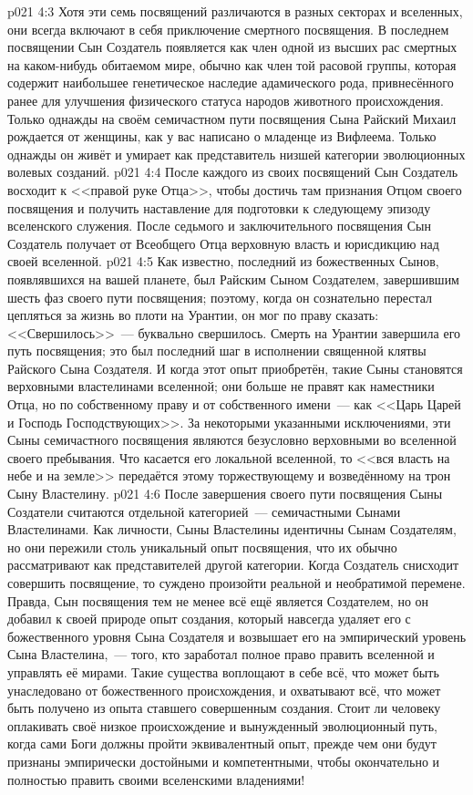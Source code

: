 \vs p021 4:3 Хотя эти семь посвящений различаются в разных секторах и вселенных, они всегда включают в себя приключение смертного посвящения. В последнем посвящении Сын Создатель появляется как член одной из высших рас смертных на каком\hyp{}нибудь обитаемом мире, обычно как член той расовой группы, которая содержит наибольшее генетическое наследие адамического рода, привнесённого ранее для улучшения физического статуса народов животного происхождения. Только однажды на своём семичастном пути посвящения Сына Райский Михаил рождается от женщины, как у вас написано о младенце из Вифлеема. Только однажды он живёт и умирает как представитель низшей категории эволюционных волевых созданий.
\vs p021 4:4 После каждого из своих посвящений Сын Создатель восходит к <<правой руке Отца>>, чтобы достичь там признания Отцом своего посвящения и получить наставление для подготовки к следующему эпизоду вселенского служения. После седьмого и заключительного посвящения Сын Создатель получает от Всеобщего Отца верховную власть и юрисдикцию над своей вселенной.
\vs p021 4:5 \pc Как известно, последний из божественных Сынов, появлявшихся на вашей планете, был Райским Сыном Создателем, завершившим шесть фаз своего пути посвящения; поэтому, когда он сознательно перестал цепляться за жизнь во плоти на Урантии, он мог по праву сказать: <<Свершилось>>~--- буквально свершилось. Смерть на Урантии завершила его путь посвящения; это был последний шаг в исполнении священной клятвы Райского Сына Создателя. И когда этот опыт приобретён, такие Сыны становятся верховными властелинами вселенной; они больше не правят как наместники Отца, но по собственному праву и от собственного имени~--- как <<Царь Царей и Господь Господствующих>>. За некоторыми указанными исключениями, эти Сыны семичастного посвящения являются безусловно верховными во вселенной своего пребывания. Что касается его локальной вселенной, то <<вся власть на небе и на земле>> передаётся этому торжествующему и возведённому на трон Сыну Властелину.
\vs p021 4:6 \pc После завершения своего пути посвящения Сыны Создатели считаются отдельной категорией~--- семичастными Сынами Властелинами. Как личности, Сыны Властелины идентичны Сынам Создателям, но они пережили столь уникальный опыт посвящения, что их обычно рассматривают как представителей другой категории. Когда Создатель снисходит совершить посвящение, то суждено произойти реальной и необратимой перемене. Правда, Сын посвящения тем не менее всё ещё является Создателем, но он добавил к своей природе опыт создания, который навсегда удаляет его с божественного уровня Сына Создателя и возвышает его на эмпирический уровень Сына Властелина,~--- того, кто заработал полное право править вселенной и управлять её мирами. Такие существа воплощают в себе всё, что может быть унаследовано от божественного происхождения, и охватывают всё, что может быть получено из опыта ставшего совершенным создания. Стоит ли человеку оплакивать своё низкое происхождение и вынужденный эволюционный путь, когда сами Боги должны пройти эквивалентный опыт, прежде чем они будут признаны эмпирически достойными и компетентными, чтобы окончательно и полностью править своими вселенскими владениями!
